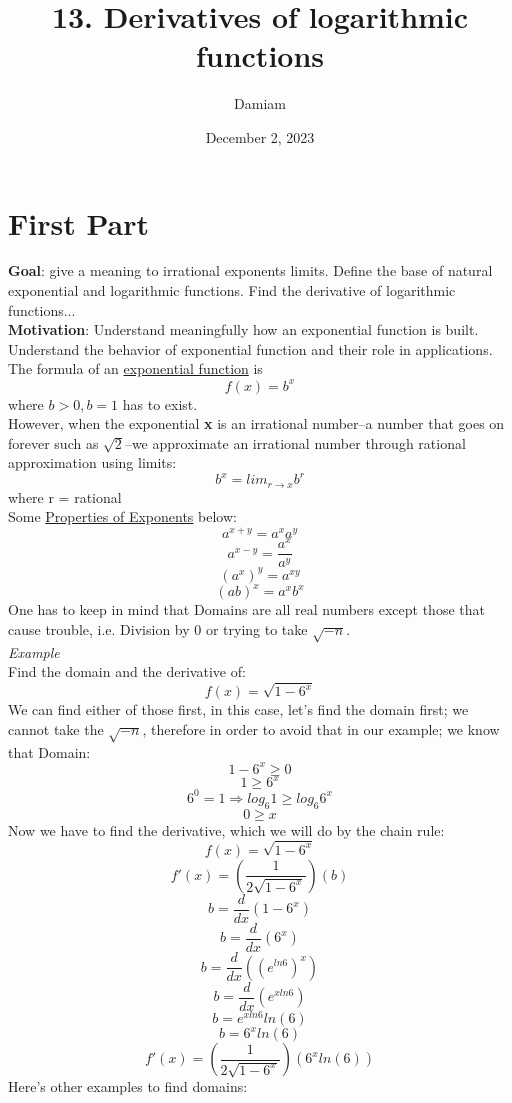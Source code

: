 \documentclass[12pt, letterpaper]{article}
\title{13. Derivatives of logarithmic functions}
\author{Damiam}
\date{December 2, 2023} %
\begin{document}
\maketitle
\section{First Part}
\textbf{Goal}: give a meaning to irrational exponents limits. Define the base of natural exponential and logarithmic functions. Find the derivative of logarithmic functions...\\
\newline
\textbf{Motivation}: Understand meaningfully how an exponential function is built. Understand the behavior of exponential function and their role in applications.\\
\newline
The formula of an \underline{exponential function} is
\[f(x) = b^x \] where \(b > 0, b = 1\) has to exist.\\
\newline
However, when the exponential \textbf{x} is an irrational number--a number that goes on forever such as \(\sqrt{2}\)--we approximate an irrational number through rational approximation using limits:
\[b^x = lim_{r \to x} b^r\] where r = rational\\
\newline
Some \underline{Properties of Exponents} below:
\[a^{x+y} = a^xa^y\]
\[a^{x-y} = \frac{a^x}{a^y}\]
\[(a^{x})^{y} = a^{xy}\]
\[(ab)^{x} = a^{x}b^{x}\]
\newline
One has to keep in mind that Domains are all real numbers except those that cause trouble, i.e. Division by 0 or trying to take \(\sqrt{-n}\). \\
\newline
\textit{Example}\\
Find the domain and the derivative of:
\[f(x) = \sqrt{1-6^{x}}\]
We can find either of those first, in this case, let's find the domain first; we cannot take the \(\sqrt{-n}\), therefore in order to avoid that in our example; we know that Domain:
\[1-6^x \geq 0\]
\[1 \geq 6^x\]
\[6^0=1 \Rightarrow log_{6} 1 \geq log_{6} 6^x\]
\[0 \geq x\]
Now we have to find the derivative, which we will do by the chain rule:
\[f(x) = \sqrt{1-6^{x}}\]
\[f'(x) = (\frac{1}{2\sqrt{1-6^{x}}})(b)\]
\[b = \frac{d}{dx}(1-6^{x})\]
\[b = \frac{d}{dx}(6^x)\]
\[b = \frac{d}{dx}((e^{ln6})^x)\]
\[b = \frac{d}{dx}(e^{xln6})\]
\[b = e^{xln6}ln(6)\]
\[b = 6^{x}ln(6)\]
\[f'(x) = (\frac{1}{2\sqrt{1-6^{x}}})(6^{x}ln(6))\]
Here's other examples to find domains:
\end{document}
